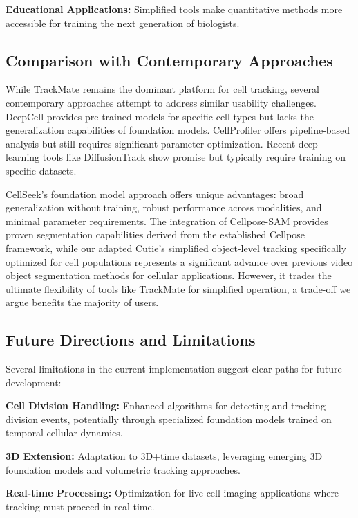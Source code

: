 \documentclass[../cellseek_paper.tex]{subfiles}
\begin{document}
\textbf{Educational Applications:} Simplified tools make quantitative methods more accessible for training the next generation of biologists.

\subsection{Comparison with Contemporary Approaches}

While TrackMate remains the dominant platform for cell tracking, several contemporary approaches attempt to address similar usability challenges. DeepCell provides pre-trained models for specific cell types but lacks the generalization capabilities of foundation models. CellProfiler offers pipeline-based analysis but still requires significant parameter optimization. Recent deep learning tools like DiffusionTrack show promise but typically require training on specific datasets.

CellSeek's foundation model approach offers unique advantages: broad generalization without training, robust performance across modalities, and minimal parameter requirements. The integration of Cellpose-SAM provides proven segmentation capabilities derived from the established Cellpose framework, while our adapted Cutie's simplified object-level tracking specifically optimized for cell populations represents a significant advance over previous video object segmentation methods for cellular applications. However, it trades the ultimate flexibility of tools like TrackMate for simplified operation, a trade-off we argue benefits the majority of users.

\subsection{Future Directions and Limitations}

Several limitations in the current implementation suggest clear paths for future development:

\textbf{Cell Division Handling:} Enhanced algorithms for detecting and tracking division events, potentially through specialized foundation models trained on temporal cellular dynamics.

\textbf{3D Extension:} Adaptation to 3D+time datasets, leveraging emerging 3D foundation models and volumetric tracking approaches.

\textbf{Real-time Processing:} Optimization for live-cell imaging applications where tracking must proceed in real-time.
\end{document}
